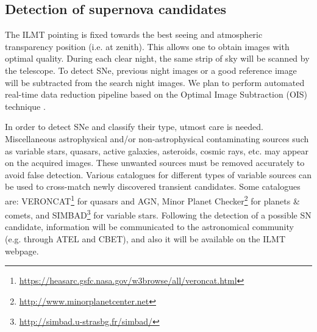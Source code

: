 \documentclass[useAMS,usenatbib]{mnras}
\begin{document}

\subsection{Detection of supernova candidates}

The ILMT pointing is fixed towards the best seeing and atmospheric transparency position (i.e. at zenith).
This allows one to obtain images with optimal quality. During each clear night, the same strip 
of sky will be scanned by the telescope. To detect SNe, previous night images or a good reference image 
will be subtracted from the search night images. We plan to perform automated real-time data reduction 
pipeline based on the Optimal Image Subtraction (OIS) technique \citep{1998ApJ...503..325A,
2000A&AS..144..363A}.

In order to detect SNe and classify their type, utmost care is needed. Miscellaneous astrophysical 
and/or non-astrophysical contaminating sources such as variable stars, quasars, active galaxies, 
asteroids, cosmic rays, etc. may appear on the acquired images. These unwanted sources must be removed 
accurately to avoid false detection. Various catalogues for different types of variable sources can be 
used to cross-match newly discovered transient candidates.
Some catalogues are: VERONCAT\footnote{\url{https://heasarc.gsfc.nasa.gov/w3browse/all/veroncat.html}}
\citep{2010A&A...518A..10V} for quasars and AGN, Minor Planet Checker\footnote{\url{http://www.minorplanetcenter.net}} 
for planets \& comets, and SIMBAD\footnote{\url{http://simbad.u-strasbg.fr/simbad/}} \citep{2000A&AS..143....9W}
for variable stars. Following the detection of a possible SN candidate, information will be communicated 
to the astronomical community (e.g. through ATEL and CBET), and also it will be available on the ILMT 
webpage.
\end{document}
